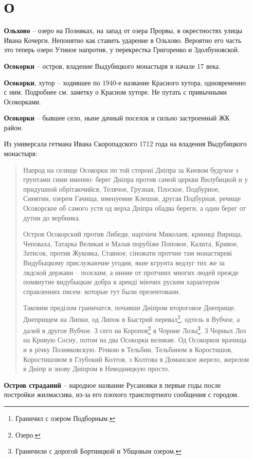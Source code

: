 \chapter*{О}

\textbf{Ольхово} – озеро на Позняках, на запад от озера Прорвы, в окрестностях улицы Ивана Кочерги. Непонятно как ставить ударение в Ольхово. Вероятно его часть это теперь озеро Утиное напротив, у перекрестка Григоренко и Здолбуновской.\\

\medskip


\textbf{Осокорки} – остров, владение Выдубицкого монастыря в начале 17 века.\\

\medskip


\textbf{Осокорки}, хутор – ходившее по 1940-е название Красного хутора, одновременно с ним. Подробнее см. заметку о Красном хуторе. Не путать с привычными Осокорками.\\

\medskip


\textbf{Осокорки} – бывшее село, ныне дачный поселок и сильно застроенный ЖК район.

Из универсала гетмана Ивана Скоропадского 1712 года на владения Выдубицкого монастыря:

\begin{quotation}
Напрод на селище Осокорки по той стороні Дніпра за Киевом будучое з грунтами сими именно: берег Дніпра против самой церкви Вилубицкой и у придушной обрітаючийся, Телячое, Грузная, Плоское, Подбурное, Синятин, озерем Гачища, именуемие Клешня, другая Подбурная, речище Осокорское об самого устя од верха Дніпра обадва береги, а один берег от дутни до вербника.

Остров Осокорский против Либеди, нарічіем Миколаев, криниці Вирища, Чеповаха, Татарка Великая и Малая порубіже Поповое, Калита, Кривое, Затисок, против Жуковка, Ставное, сіножати протчие там монастиреві Видубыцкому прислужаючие угодия, якие кгрунта ведлуг тих же за лядской держави – полским, а инние от протчиих многих людей прежде помянутие видубыцкие добра в аренді міючих руским характером справленних писем: которые тут были презентовани.

Таковим преділом граничатся, почавши Дніпром второговое Днеприще. Днеприщем на Липки, од Липок в Быстрий перевал\footnote{Граничил с озером Подборным.}, одтель в Вубчое, а далей в другое Вубчое. З сего на Коропов\footnote{Озеро.} в Чорние Лозы\footnote{Граничили с дорогой Бортницкой и Убщовым озером.}. З Чорных Лоз на Кривую Сосну, потом на два Осокорки великие. Од Осокорков врачища и в річку Позняковскую. Річкою в Тельбин, Тельбином в Коростишов, Коростишовом в Глубокий Колтов, з Колтова в Доманское жерело, жерелом в Дніпр и знову Дніпром в Неводницкую просто.
\end{quotation}

\medskip


\textbf{Остров страданий} – народное название Русановки в первые годы после постройки жилмассива, из-за его плохого транспортного сообщения с городом.

